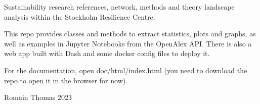 \label{index_md_README}%
%
 Sustainability research references, network, methods and theory landscape analysis within the Stockholm Resilience Centre.

This repo provides classes and methods to extract statistics, plots and graphs, as well as examples in Jupyter Notebooks from the Open\+Alex API. There is also a web app built with Dash and some docker config files to deploy it.

For the documentation, open {\ttfamily doc/html/index.\+html} (you need to download the repo to open it in the browser for now).

Romain Thomas 2023 